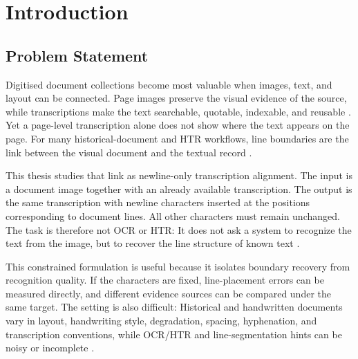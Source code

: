 
\chapter{Introduction}
\label{cha:introduction}

\section{Problem Statement}
\label{sec:intro_problem_statement}

Digitised document collections become most valuable when images, text, and layout can be connected. Page images preserve the visual evidence of the source, while transcriptions make the text searchable, quotable, indexable, and reusable . Yet a page-level transcription alone does not show where the text appears on the page. For many historical-document and HTR workflows, line boundaries are the link between the visual document and the textual record .

This thesis studies that link as newline-only transcription alignment. The input is a document image together with an already available transcription. The output is the same transcription with newline characters inserted at the positions corresponding to document lines. All other characters must remain unchanged. The task is therefore not OCR or HTR: It does not ask a system to recognize the text from the image, but to recover the line structure of known text .

This constrained formulation is useful because it isolates boundary recovery from recognition quality. If the characters are fixed, line-placement errors can be measured directly, and different evidence sources can be compared under the same target. The setting is also difficult: Historical and handwritten documents vary in layout, handwriting style, degradation, spacing, hyphenation, and transcription conventions, while OCR/HTR and line-segmentation hints can be noisy or incomplete .

